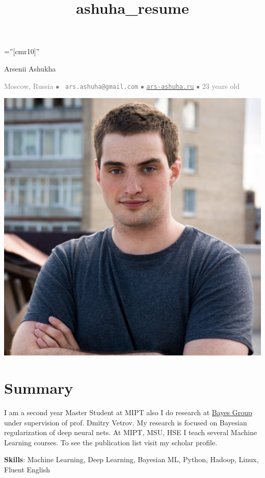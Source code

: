 \documentclass[a4paper,10pt]{article} %
\title{ashuha_resume}
\begin{document}
\pagestyle{empty} %

\font\fb=''[cmr10]'' %
\oddsidemargin=0pt 		%

\begin{center}
	{\huge Arsenii Ashukha}
\end{center}
\begin{center}
\textcolor{gray}{
Moscow, Russia $\bullet$ 
\Letter~\textcolor{gray}{\texttt{ars.ashuha@gmail.com}} $\bullet$ \href{https://ars-ashuha.ru/}{\textcolor{gray}{\texttt{ars-ashuha.ru}}} $\bullet$
23 years old \smiley} 

\end{center}
\setlength{\columnsep}{-330pt}
\begin{multicols}{2}
\includegraphics[scale=0.07]{../images/avatar_v3}

\section{Summary}
 \vspace{-0.2cm}

I am a second year Master Student at MIPT also I do research at \href{bayesgroup.ru}{Bayes Group} under supervision of prof. Dmitry Vetrov. My research is focused on Bayesian regularization of deep neural nets. At MIPT, MSU, HSE I teach several Machine Learning courses. To see the publication list visit my scholar profile.

\vspace{0.2cm}
\textbf{Skills}: Machine Learning, Deep Learning, Bayesian ML, Python, Hadoop, Linux, Fluent English

\end{multicols}
\end{document}
